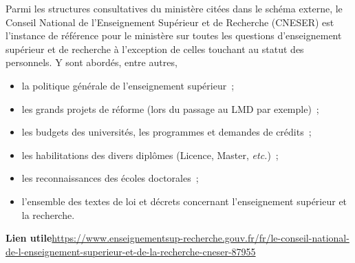 Parmi les structures consultatives du minist\`ere cit\'ees dans le sch\'ema externe,
le Conseil National de l'Enseignement Sup\'erieur et de Recherche (CNESER) est l'instance de r\'ef\'erence pour le minist\`ere sur toutes les questions d'enseignement
sup\'erieur et de recherche \`a l'exception de celles touchant au statut des personnels. Y sont abord\'es, entre autres,
\begin{itemize}
\item la politique g\'en\'erale de l'enseignement sup\'erieur~;
\item les grands projets de r\'eforme (lors du passage au LMD par
exemple)~;
\item les budgets des universit\'es, les programmes et
demandes de cr\'edits~;
\item les habilitations des divers
dipl\^omes (Licence, Master, {\em etc.})~;
\item les reconnaissances
des \'ecoles doctorales~;
\item l'ensemble des textes de loi et
d\'ecrets concernant l'enseignement sup\'erieur et la recherche.
\end{itemize}
\textbf{Lien utile\hspace{0.5em}}\url{https://www.enseignementsup-recherche.gouv.fr/fr/le-conseil-national-de-l-enseignement-superieur-et-de-la-recherche-cneser-87955}

